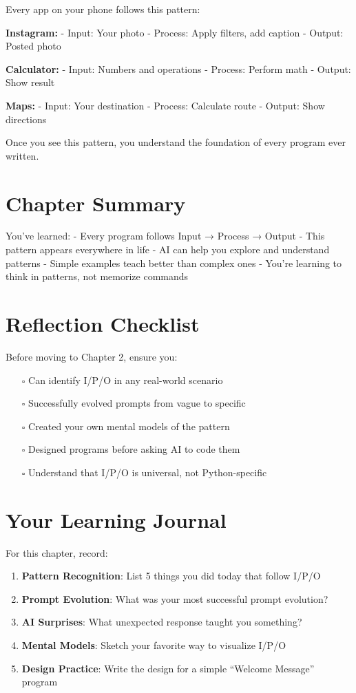 \documentclass[
  letterpaper,
  DIV=11,
  numbers=noendperiod,
  oneside]{scrreprt}
\providecommand{\tightlist}{%
  \setlength{\itemsep}{0pt}\setlength{\parskip}{0pt}}\usepackage{longtable,booktabs,array}
\begin{document}
Every app on your phone follows this pattern:

\textbf{Instagram:} - Input: Your photo - Process: Apply filters, add
caption - Output: Posted photo

\textbf{Calculator:} - Input: Numbers and operations - Process: Perform
math - Output: Show result

\textbf{Maps:} - Input: Your destination - Process: Calculate route -
Output: Show directions

Once you see this pattern, you understand the foundation of every
program ever written.

\section{Chapter Summary}\label{chapter-summary-1}

You've learned: - Every program follows Input → Process → Output - This
pattern appears everywhere in life - AI can help you explore and
understand patterns - Simple examples teach better than complex ones -
You're learning to think in patterns, not memorize commands

\section{Reflection Checklist}\label{reflection-checklist}

Before moving to Chapter 2, ensure you:

\begin{itemize}
\tightlist
\item[$\square$]
  Can identify I/P/O in any real-world scenario
\item[$\square$]
  Successfully evolved prompts from vague to specific
\item[$\square$]
  Created your own mental models of the pattern
\item[$\square$]
  Designed programs before asking AI to code them
\item[$\square$]
  Understand that I/P/O is universal, not Python-specific
\end{itemize}

\section{Your Learning Journal}\label{your-learning-journal-1}

For this chapter, record:

\begin{enumerate}
\def\labelenumi{\arabic{enumi}.}
\tightlist
\item
  \textbf{Pattern Recognition}: List 5 things you did today that follow
  I/P/O
\item
  \textbf{Prompt Evolution}: What was your most successful prompt
  evolution?
\item
  \textbf{AI Surprises}: What unexpected response taught you something?
\item
  \textbf{Mental Models}: Sketch your favorite way to visualize I/P/O
\item
  \textbf{Design Practice}: Write the design for a simple ``Welcome
  Message'' program
\end{enumerate}
\end{document}
